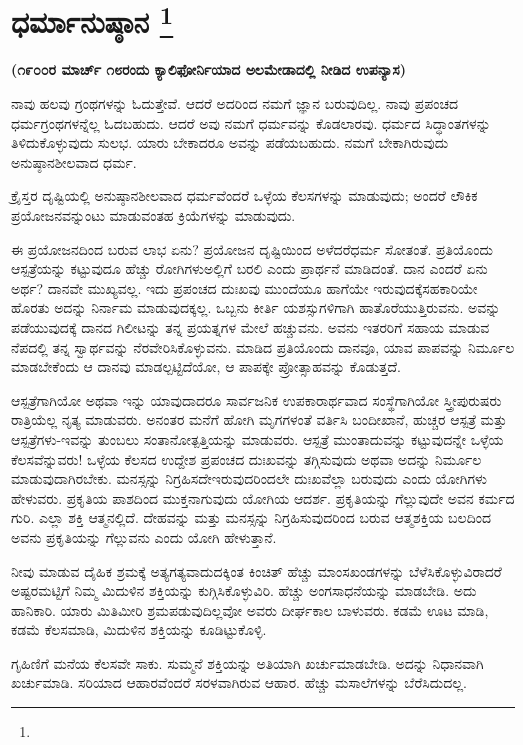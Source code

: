 
\vspace{-0.5cm}

\chapter[ಧರ್ಮಾನುಷ್ಠಾನ ]{ಧರ್ಮಾನುಷ್ಠಾನ \protect\footnote{}}

\begin{center}
\textbf{(೧೯೦೦ರ ಮಾರ್ಚ್​ ೧೮ರಂದು ಕ್ಯಾಲಿಫೋರ್ನಿಯಾದ ಅಲಮೇಡಾದಲ್ಲಿ ನೀಡಿದ\general{\break } ಉಪನ್ಯಾಸ)}
\end{center}

ನಾವು ಹಲವು ಗ್ರಂಥಗಳನ್ನು ಓದುತ್ತೇವೆ. ಆದರೆ ಅದರಿಂದ ನಮಗೆ ಜ್ಞಾನ ಬರುವುದಿಲ್ಲ. ನಾವು ಪ್ರಪಂಚದ ಧರ್ಮಗ್ರಂಥಗಳನ್ನೆಲ್ಲ ಓದಬಹುದು. ಆದರೆ ಅವು ನಮಗೆ ಧರ್ಮವನ್ನು ಕೊಡಲಾರವು. ಧರ್ಮದ ಸಿದ್ಧಾಂತಗಳನ್ನು ತಿಳಿದುಕೊಳ್ಳುವುದು ಸುಲಭ. ಯಾರು ಬೇಕಾದರೂ ಅವನ್ನು ಪಡೆಯಬಹುದು. ನಮಗೆ ಬೇಕಾಗಿರುವುದು ಅನುಷ್ಠಾನಶೀಲವಾದ ಧರ್ಮ.

ಕ್ರೈಸ್ತರ ದೃಷ್ಟಿಯಲ್ಲಿ ಅನುಷ್ಠಾನಶೀಲವಾದ ಧರ್ಮವೆಂದರೆ ಒಳ್ಳೆಯ ಕೆಲಸಗಳನ್ನು ಮಾಡುವುದು; ಅಂದರೆ ಲೌಕಿಕ ಪ್ರಯೋಜನವನ್ನುಂಟು ಮಾಡುವಂತಹ ಕ್ರಿಯೆಗಳನ್ನು ಮಾಡುವುದು.

ಈ ಪ್ರಯೋಜನದಿಂದ ಬರುವ ಲಾಭ ಏನು? ಪ್ರಯೋಜನ ದೃಷ್ಟಿಯಿಂದ ಅಳೆದರೆ\break ಧರ್ಮ ಸೋತಂತೆ. ಪ್ರತಿಯೊಂದು ಆಸ್ಪತ್ರೆಯನ್ನು ಕಟ್ಟುವುದೂ ಹೆಚ್ಚು ರೋಗಿಗಳು\break ಅಲ್ಲಿಗೆ ಬರಲಿ ಎಂದು ಪ್ರಾರ್ಥನೆ ಮಾಡಿದಂತೆ. ದಾನ ಎಂದರೆ ಏನು ಅರ್ಥ? ದಾನವೇ ಮುಖ್ಯವಲ್ಲ. ಇದು ಪ್ರಪಂಚದ ದುಃಖವು ಮುಂದೆಯೂ ಹಾಗೆಯೇ ಇರುವುದಕ್ಕೆ\break ಸಹಕಾರಿಯೇ ಹೊರತು ಅದನ್ನು ನಿರ್ನಾಮ ಮಾಡುವುದಕ್ಕಲ್ಲ. ಒಬ್ಬನು ಕೀರ್ತಿ ಯಶಸ್ಸುಗಳಿಗಾಗಿ ಹಾತೊರೆಯುತ್ತಿರುವನು. ಅವನ್ನು ಪಡೆಯುವುದಕ್ಕೆ ದಾನದ ಗಿಲೀಟನ್ನು ತನ್ನ ಪ್ರಯತ್ನಗಳ ಮೇಲೆ ಹಚ್ಚುವನು. ಅವನು ಇತರರಿಗೆ ಸಹಾಯ ಮಾಡುವ ನೆಪದಲ್ಲಿ ತನ್ನ ಸ್ವಾರ್ಥವನ್ನು ನೆರವೇರಿಸಿಕೊಳ್ಳುವನು. ಮಾಡಿದ ಪ್ರತಿಯೊಂದು ದಾನವೂ, ಯಾವ ಪಾಪವನ್ನು ನಿರ್ಮೂಲ ಮಾಡಬೇಕೆಂದು ಆ ದಾನವು ಮಾಡಲ್ಪಟ್ಟಿದೆಯೋ, ಆ ಪಾಪಕ್ಕೇ ಪ್ರೋತ್ಸಾಹವನ್ನು ಕೊಡುತ್ತದೆ.

ಆಸ್ಪತ್ರೆಗಾಗಿಯೋ ಅಥವಾ ಇನ್ನು ಯಾವುದಾದರೂ ಸಾರ್ವಜನಿಕ ಉಪಕಾರಾರ್ಥ\-ವಾದ ಸಂಸ್ಥೆಗಾಗಿಯೋ ಸ್ತ್ರೀಪುರುಷರು ರಾತ್ರಿಯೆಲ್ಲ ನೃತ್ಯ ಮಾಡುವರು. ಅನಂತರ ಮನೆಗೆ ಹೋಗಿ ಮೃಗಗಳಂತೆ ವರ್ತಿಸಿ ಬಂದೀಖಾನೆ, ಹುಚ್ಚರ ಆಸ್ಪತ್ರೆ ಮತ್ತು ಆಸ್ಪತ್ರೆಗಳು-ಇವನ್ನು ತುಂಬಲು ಸಂತಾನೋತ್ಪತ್ತಿಯನ್ನು ಮಾಡುವರು. ಆಸ್ಪತ್ರೆ ಮುಂತಾದುವನ್ನು ಕಟ್ಟುವುದನ್ನೇ ಒಳ್ಳೆಯ ಕೆಲಸವೆನ್ನುವರು! ಒಳ್ಳೆಯ ಕೆಲಸದ ಉದ್ದೇಶ ಪ್ರಪಂಚದ ದುಃಖವನ್ನು ತಗ್ಗಿಸುವುದು ಅಥವಾ ಅದನ್ನು ನಿರ್ಮೂಲ ಮಾಡುವುದಾಗಿರಬೇಕು. ಮನಸ್ಸನ್ನು ನಿಗ್ರಹಿಸದೇ\break ಇರುವುದರಿಂದಲೇ ದುಃಖವೆಲ್ಲಾ ಬರುವುದು ಎಂದು ಯೋಗಿಗಳು ಹೇಳುವರು. ಪ್ರಕೃತಿಯ ಪಾಶದಿಂದ ಮುಕ್ತನಾಗುವುದು ಯೋಗಿಯ ಆದರ್ಶ. ಪ್ರಕೃತಿಯನ್ನು ಗೆಲ್ಲುವುದೇ ಅವನ ಕರ್ಮದ ಗುರಿ. ಎಲ್ಲಾ ಶಕ್ತಿ ಆತ್ಮನಲ್ಲಿದೆ. ದೇಹವನ್ನು ಮತ್ತು ಮನಸ್ಸನ್ನು ನಿಗ್ರಹಿಸುವುದರಿಂದ ಬರುವ ಆತ್ಮಶಕ್ತಿಯ ಬಲದಿಂದ ಅವನು ಪ್ರಕೃತಿಯನ್ನು ಗೆಲ್ಲುವನು ಎಂದು ಯೋಗಿ ಹೇಳುತ್ತಾನೆ.

ನೀವು ಮಾಡುವ ದೈಹಿಕ ಶ್ರಮಕ್ಕೆ ಅತ್ಯಗತ್ಯವಾದುದಕ್ಕಿಂತ ಕಿಂಚಿತ್​ ಹೆಚ್ಚು ಮಾಂಸಖಂಡಗಳನ್ನು ಬೆಳೆಸಿಕೊಳ್ಳುವಿರಾದರೆ ಅಷ್ಟರಮಟ್ಟಿಗೆ ನಿಮ್ಮ ಮಿದುಳಿನ ಶಕ್ತಿಯನ್ನು ಕುಗ್ಗಿಸಿಕೊಳ್ಳುವಿರಿ. ಹೆಚ್ಚು ಅಂಗಸಾಧನೆಯನ್ನು ಮಾಡಬೇಡಿ. ಅದು ಹಾನಿಕಾರಿ. ಯಾರು ಮಿತಿಮೀರಿ ಶ್ರಮಪಡುವುದಿಲ್ಲವೋ ಅವರು ದೀರ್ಘಕಾಲ ಬಾಳುವರು. ಕಡಮೆ ಊಟ ಮಾಡಿ, ಕಡಮೆ ಕೆಲಸಮಾಡಿ, ಮಿದುಳಿನ ಶಕ್ತಿಯನ್ನು ಕೂಡಿಟ್ಟುಕೊಳ್ಳಿ.

ಗೃಹಿಣಿಗೆ ಮನೆಯ ಕೆಲಸವೇ ಸಾಕು. ಸುಮ್ಮನೆ ಶಕ್ತಿಯನ್ನು ಅತಿಯಾಗಿ ಖರ್ಚುಮಾಡಬೇಡಿ. ಅದನ್ನು ನಿಧಾನವಾಗಿ ಖರ್ಚುಮಾಡಿ. ಸರಿಯಾದ ಆಹಾರವೆಂದರೆ ಸರಳವಾಗಿರುವ ಆಹಾರ. ಹೆಚ್ಚು ಮಸಾಲೆಗಳನ್ನು ಬೆರೆಸಿದುದಲ್ಲ.

